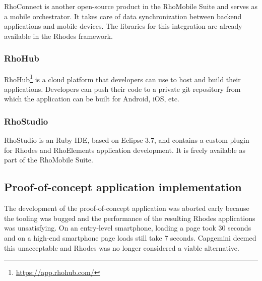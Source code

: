 RhoConnect is another open-source product in the RhoMobile Suite and serves as a mobile orchestrator. It takes care of data synchronization between backend applications and mobile devices. The libraries for this integration are already available in the Rhodes framework.

\subsubsection{RhoHub}

RhoHub\footnote{\url{https://app.rhohub.com/}} is a cloud platform that developers can use to host and build their applications. Developers can push their code to a private git repository from which the application can be built for Android, iOS, etc.

\subsubsection{RhoStudio}

RhoStudio is an Ruby IDE, based on Eclipse 3.7, and contains a custom plugin for Rhodes and RhoElements application development. It is freely available as part of the RhoMobile Suite.

\subsection{Proof-of-concept application implementation}

The development of the proof-of-concept application was aborted early because the tooling was bugged and the performance of the resulting Rhodes applications was unsatisfying. On an entry-level smartphone, loading a page took 30 seconds and on a high-end smartphone page loads still take 7 seconds. Capgemini deemed this unacceptable and Rhodes was no longer considered a viable alternative.